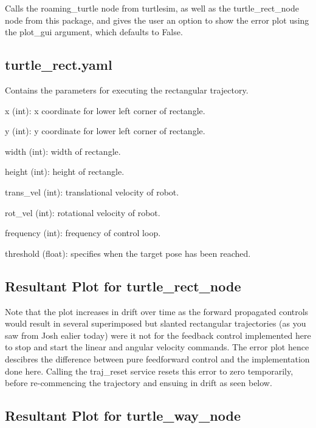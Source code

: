 Calls the {\ttfamily roaming\+\_\+turtle} node from {\ttfamily turtlesim}, as well as the {\ttfamily turtle\+\_\+rect\+\_\+node} node from this package, and gives the user an option to show the error plot using the {\ttfamily plot\+\_\+gui} argument, which defaults to {\ttfamily False}.

\subsection*{turtle\+\_\+rect.\+yaml}

Contains the parameters for executing the rectangular trajectory.


\begin{DoxyItemize}
\item {\ttfamily x (int)}\+: x coordinate for lower left corner of rectangle.
\item {\ttfamily y (int)}\+: y coordinate for lower left corner of rectangle.
\item {\ttfamily width (int)}\+: width of rectangle.
\item {\ttfamily height (int)}\+: height of rectangle.
\item {\ttfamily trans\+\_\+vel (int)}\+: translational velocity of robot.
\item {\ttfamily rot\+\_\+vel (int)}\+: rotational velocity of robot.
\item {\ttfamily frequency (int)}\+: frequency of control loop.
\item {\ttfamily threshold (float)}\+: specifies when the target pose has been reached.
\end{DoxyItemize}

\subsection*{Resultant Plot for turtle\+\_\+rect\+\_\+node}



Note that the plot increases in drift over time as the forward propagated controls would result in several superimposed but slanted rectangular trajectories (as you saw from Josh ealier today) were it not for the feedback control implemented here to stop and start the linear and angular velocity commands. The error plot hence descibres the difference between pure feedforward control and the implementation done here. Calling the {\ttfamily traj\+\_\+reset} service resets this error to zero temporarily, before re-\/commencing the trajectory and ensuing in drift as seen below.



\subsection*{Resultant Plot for turtle\+\_\+way\+\_\+node}

 